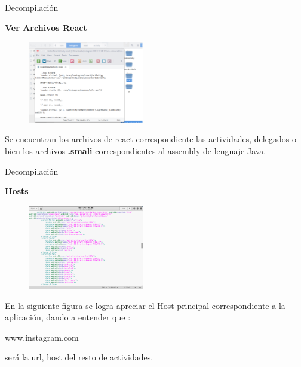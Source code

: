 \begin{frame}[t,fragile]{Decompilación}

\textbf{Ver Archivos React}

\begin{figure} 
\vspace{2pt}
  \begin{center}
    \includegraphics[width=0.45\textwidth]{react.png}
    \label{fig:databaseUserTable}
  \end{center}
  \vspace{2pt}
\end{figure} 

\bigskip

 Se encuentran los archivos de react correspondiente las actividades, delegados o bien los archivos \textbf{.smali} correspondientes al assembly de lenguaje Java.

\end{frame}

\begin{frame}[t,fragile]{Decompilación}

\textbf{Hosts}

\begin{figure} 
\vspace{2pt}
  \begin{center}
    \includegraphics[width=0.45\textwidth]{xmlhost.png}
    \label{fig:databaseUserTable}
  \end{center}
  \vspace{2pt}
\end{figure} 

\bigskip

En la siguiente figura se logra apreciar el Host principal correspondiente a la aplicación, dando a entender que :

\begin{center}
    www.instagram.com    
\end{center}
será la url, host del resto de actividades.



\end{frame}

